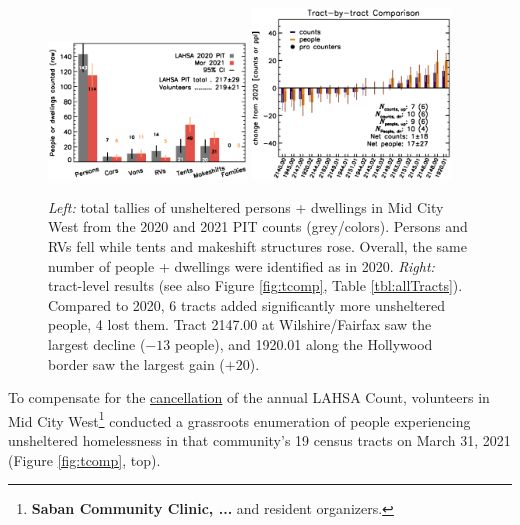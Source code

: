 \documentclass[11pt]{article}
\def\bfr{\bf\color{red}}
\begin{document}
\begin{figure}[h]
	\centering
	\includegraphics[width = 0.47\textwidth, trim = 1cm 0cm 0cm 1cm]{bars}
	\includegraphics[width = 0.47\textwidth, trim = 0cm 0cm 0cm 1cm]{tractsYrYr.eps}	
	\caption{{\it Left:} total tallies of unsheltered persons + dwellings in Mid City West from 
			the 2020 and 2021 PIT counts (grey/colors). Persons and RVs fell while 
			tents and makeshift structures rose. Overall, the same number of 
			people + dwellings were identified as in 2020. {\it Right:} tract-level
			results (see also Figure \ref{fig:tcomp}, Table \ref{tbl:allTracts}). Compared to 
			2020, 6 tracts added significantly more unsheltered people, 4 lost them. Tract 
			2147.00 at Wilshire/Fairfax saw the largest decline ($-13$ people), and 1920.01 
			along the Hollywood border saw the largest gain ($+20$).}
	\label{fig:rawCounts}
\end{figure}


 To compensate for the 
\href{https://laist.com/latest/post/20201209/LAHSA-cancels-2021-homeless-count-los-angeles-covid-19}
{cancellation} of the annual LAHSA Count, volunteers in Mid City 
West\footnote{{\bfr Saban Community Clinic, ...} and resident organizers.} conducted a grassroots enumeration of 
people experiencing unsheltered homelessness in that community's 19 census tracts on 
March 31, 2021 (Figure \ref{fig:tcomp}, top).\\
\end{document}
